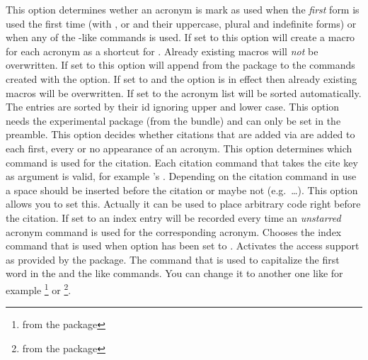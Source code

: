 \documentclass[load-preamble+,scrartcl={DIV10}]{cnltx-doc}
\begin{document}
\begin{options}
    This option determines wether an acronym is mark as used when the
    \emph{first} form is used the first time (with ,  or
     and their uppercase, plural and indefinite forms) or when any
    of the -like commands is used.   
    If set to  this option will create a macro  for
    each acronym as a shortcut for .  Already existing macros
    will \emph{not} be overwritten.
    If set to  this option will append
     from the  package to the commands created with
    the  option.
    If set to  and the option  is in effect
    then already existing macros will be overwritten.
    If set to  the acronym list will be sorted automatically.  The
    entries are sorted by their \acs{id} ignoring upper and lower case.  This
    option needs the experimental package  (from the
     bundle) and can only be set in the preamble.
    This option decides whether citations that are added via  are
    added to each first, every or no appearance of an acronym.
    This option determines which command is used for the citation.  Each
    citation command that takes the cite key as argument is valid, for example
    's .
    Depending on the citation command in use a space should be inserted before
    the citation or maybe not (e.g.\ \ldots).  This option
    allows you to set this.  Actually it can be used to place arbitrary code
    right before the citation.
    If set to  an index entry will be recorded
    every time an \emph{unstarred} acronym command is used for the
    corresponding acronym.
    Chooses the index command that is used when option
     has been set to .
    Activates the access support as provided by the
     package.
    The command that is used to capitalize the first word in the  and
    the like commands.  You can change it to another one like for example
    \footnote{from the  package} or
    \footnote{from the  package}.
\end{options}
 
\end{document}

